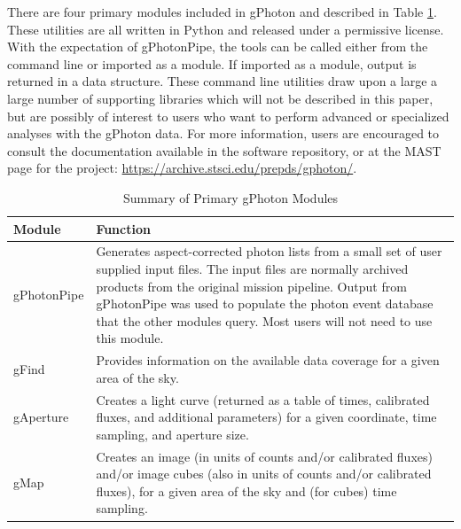 \documentclass[5p]{elsarticle}
\begin{document}
There are four primary modules included in gPhoton and described in Table \ref{moduledesc}. These utilities are all written in Python and released under a permissive license. With the expectation of gPhotonPipe, the tools can be called either from the command line or imported as a module. If imported as a module, output is returned in a data structure. These command line utilities draw upon a large a large number of supporting libraries which will not be described in this paper, but are possibly of interest to users who want to perform advanced or specialized analyses with the gPhoton data.  For more information, users are encouraged to consult the documentation available in the software repository, or at the MAST page for the project: \url{https://archive.stsci.edu/prepds/gphoton/}.

\begin{table}
\begin{tabular}{|p{2cm}|p{6cm}|}
\hline
	{\bf Module} & {\bf Function}\\\hline
	gPhotonPipe & Generates aspect-corrected photon lists from a small set of user supplied input files.  The input files are normally archived products from the original mission pipeline. Output from gPhotonPipe was used to populate the photon event database that the other modules query.  Most users will not need to use this module.\\\hline
	gFind & Provides information on the available data coverage for a given area of the sky.\\\hline
	gAperture & Creates a light curve (returned as a table of times, calibrated fluxes, and additional parameters) for a given coordinate, time sampling, and aperture size.\\\hline
	gMap & Creates an image (in units of counts and/or calibrated fluxes) and/or image cubes (also in units of counts and/or calibrated fluxes), for a given area of the sky and (for cubes) time sampling.\\
\hline
\end{tabular}
\caption{Summary of Primary gPhoton Modules}
\label{moduledesc}
\end{table}
\end{document}
